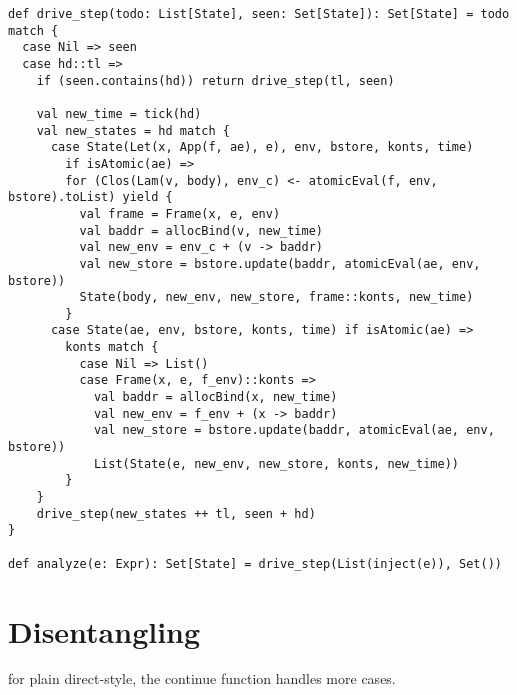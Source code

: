 \documentclass[acmsmall,review,anonymous]{acmart}\settopmatter{printfolios=true,printccs=false,printacmref=false}
\begin{document}
\begin{lstlisting}
def drive_step(todo: List[State], seen: Set[State]): Set[State] = todo match {
  case Nil => seen
  case hd::tl =>
    if (seen.contains(hd)) return drive_step(tl, seen)

    val new_time = tick(hd)
    val new_states = hd match {
      case State(Let(x, App(f, ae), e), env, bstore, konts, time) 
        if isAtomic(ae) =>
        for (Clos(Lam(v, body), env_c) <- atomicEval(f, env, bstore).toList) yield {
          val frame = Frame(x, e, env)
          val baddr = allocBind(v, new_time)
          val new_env = env_c + (v -> baddr)
          val new_store = bstore.update(baddr, atomicEval(ae, env, bstore))
          State(body, new_env, new_store, frame::konts, new_time)
        }
      case State(ae, env, bstore, konts, time) if isAtomic(ae) =>
        konts match {
          case Nil => List()
          case Frame(x, e, f_env)::konts =>
            val baddr = allocBind(x, new_time)
            val new_env = f_env + (x -> baddr)
            val new_store = bstore.update(baddr, atomicEval(ae, env, bstore))
            List(State(e, new_env, new_store, konts, new_time))
        }
    }
    drive_step(new_states ++ tl, seen + hd)
}

def analyze(e: Expr): Set[State] = drive_step(List(inject(e)), Set())
\end{lstlisting}

\section{Disentangling} \label{disen}

for plain direct-style, the continue function handles more cases.
\end{document}
